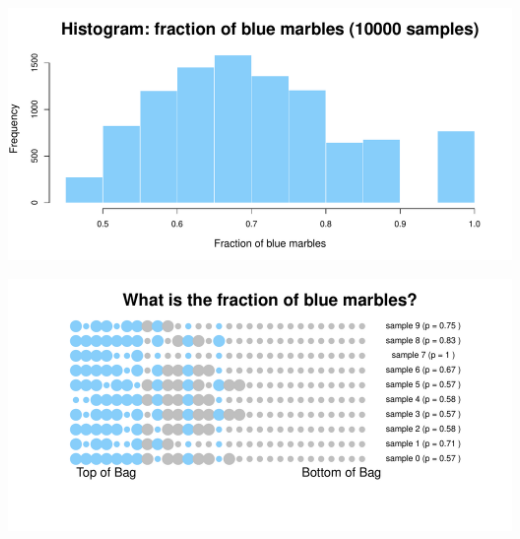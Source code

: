 \documentclass[aspectratio=169]{beamer}
\theoremstyle{principle}
\begin{document}
\begin{frame}
\begin{center}
\includegraphics[scale=0.57]{bias_hist_10000_samples.pdf}
\end{center}
\end{frame}

\begin{frame}
\begin{center}
\includegraphics[scale=0.57]{bias_sample_full.pdf}
\end{center}
\end{frame}
\end{document}
